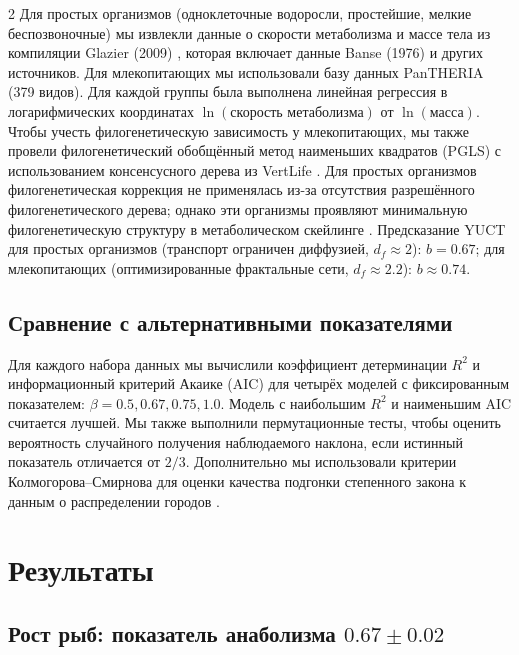 \documentclass[11pt,a4paper]{article}
\newcommand{\df}{d_f}
\begin{document}
\begin{multicols}{2}
		Для простых организмов (одноклеточные водоросли, простейшие, мелкие беспозвоночные) мы извлекли данные о скорости метаболизма и массе тела из компиляции Glazier (2009) \cite{Glazier2009}, которая включает данные Banse (1976) \cite{Banse1976} и других источников. Для млекопитающих мы использовали базу данных PanTHERIA \cite{PanTHERIA} (379 видов). Для каждой группы была выполнена линейная регрессия в логарифмических координатах \(\ln(\text{скорость метаболизма})\) от \(\ln(\text{масса})\). Чтобы учесть филогенетическую зависимость у млекопитающих, мы также провели филогенетический обобщённый метод наименьших квадратов (PGLS) с использованием консенсусного дерева из VertLife \cite{VertLife}. Для простых организмов филогенетическая коррекция не применялась из-за отсутствия разрешённого филогенетического дерева; однако эти организмы проявляют минимальную филогенетическую структуру в метаболическом скейлинге \cite{Glazier2005}. Предсказание YUCT для простых организмов (транспорт ограничен диффузией, \(\df \approx 2\)): \(b = 0.67\); для млекопитающих (оптимизированные фрактальные сети, \(\df \approx 2.2\)): \(b \approx 0.74\).
		
		\subsection{Сравнение с альтернативными показателями}
		
		Для каждого набора данных мы вычислили коэффициент детерминации \(R^2\) и информационный критерий Акаике (AIC) для четырёх моделей с фиксированным показателем: \(\beta = 0.5, 0.67, 0.75, 1.0\). Модель с наибольшим \(R^2\) и наименьшим AIC считается лучшей. Мы также выполнили пермутационные тесты, чтобы оценить вероятность случайного получения наблюдаемого наклона, если истинный показатель отличается от \(2/3\). Дополнительно мы использовали критерии Колмогорова–Смирнова для оценки качества подгонки степенного закона к данным о распределении городов \cite{Clauset2009}.
		
		\section{Результаты}
		
		\subsection{Рост рыб: показатель анаболизма \(0.67 \pm 0.02\)}
		

\end{multicols}
\end{document}
